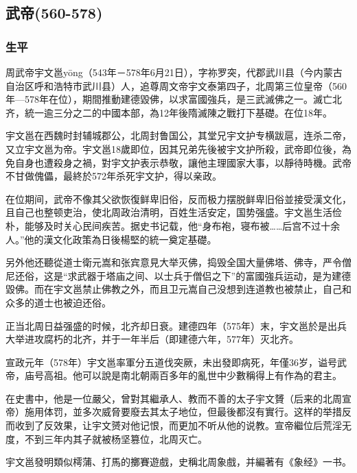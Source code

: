 
\subsection{武帝\tiny(560-578)}

\subsubsection{生平}

周武帝宇文邕yōng（543年－578年6月21日），字祢罗突，代郡武川县（今内蒙古自治区呼和浩特市武川县）人，追尊周文帝宇文泰第四子，北周第三位皇帝（560年—578年在位），期間推動建德毀佛，以求富國強兵，是三武滅佛之一。滅亡北齐，統一逾三分之二的中國本部，為12年後隋滅陳之戰打下基礎。在位18年。

宇文邕在西魏时封辅城郡公，北周封鲁国公，其堂兄宇文护专横跋扈，连杀二帝，又立宇文邕为帝。宇文邕18歲即位，因其兄弟先後被宇文护所殺，武帝即位後，為免自身也遭殺身之禍，對宇文护表示恭敬，讓他主理國家大事，以靜待時機。武帝不甘做傀儡，最終於572年杀死宇文护，得以亲政。

在位期间，武帝不像其父欲恢復鲜卑旧俗，反而极力摆脱鲜卑旧俗並接受漢文化，且自己也整顿吏治，使北周政治清明，百姓生活安定，国势强盛。宇文邕生活俭朴，能够及时关心民间疾苦。据史书记载，他“身布袍，寝布被……后宫不过十余人。”他的漢文化政策為日後楊堅的統一奠定基礎。

另外他还聽從道士衛元嵩和张宾意見大举灭佛，捣毁全国大量佛塔、佛寺，严令僧尼还俗，这是“求武器于塔庙之间、以士兵于僧侣之下”的富國強兵运动，是为建德毀佛。而在宇文邕禁止佛教之外，而且卫元嵩自己没想到连道教也被禁止，自己和众多的道士也被迫还俗。

正当北周日益强盛的时候，北齐却日衰。建德四年（575年）末，宇文邕於是出兵大举进攻腐朽的北齐，并于一年半后（即建德六年，577年）灭北齐。

宣政元年（578年）宇文邕率軍分五道伐突厥，未出發即病死，年僅36岁，谥号武帝，庙号高祖。他可以說是南北朝兩百多年的亂世中少數稱得上有作為的君主。

在史書中，他是一位嚴父，曾對其繼承人、教而不善的太子宇文贇（后来的北周宣帝）施用体罚，並多次威脅要廢去其太子地位，但最後都沒有實行。这样的举措反而收到了反效果，让宇文赟对他记恨，而更加不听从他的说教。宣帝繼位后荒淫无度，不到三年内其子就被杨坚篡位，北周灭亡。

宇文邕發明類似樗蒲、打馬的擲賽遊戲，史稱北周象戲，并編著有《象经》一书。

